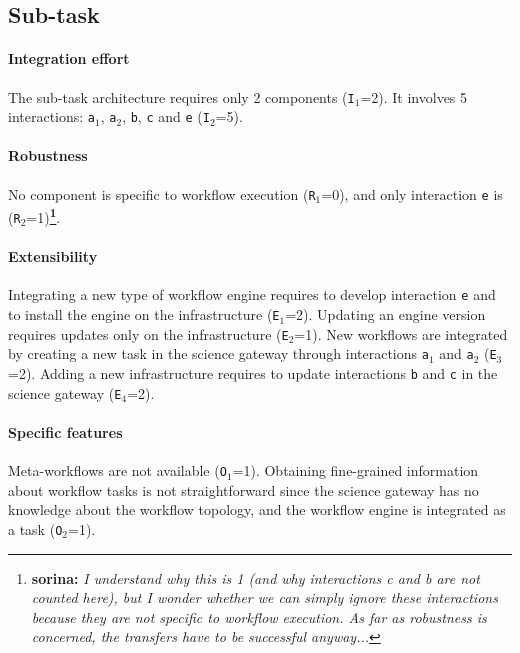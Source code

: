 \documentclass[preprint,3p,twocolumn]{elsarticle}
\newcommand{\todo}[1]{\color{blue}\xspace[\emph{#1}]\xspace\color{black}}
\newcommand{\note}[2]{\textbf{\Large{\color{blue}\footnote{{\color{blue}\textbf{#1:} \textit{#2}\color{black}}}}}}
\begin{document}
\subsection{Sub-task}

\paragraph{Integration effort} The sub-task architecture requires only 2
components (\texttt{I$_1$}=2).  It involves 5 interactions:
\texttt{a$_1$}, \texttt{a$_2$}, \texttt{b}, \texttt{c} and
\texttt{e} (\texttt{I$_2$}=5).

\paragraph{Robustness} No component is specific to workflow execution
(\texttt{R$_1$}=0), and only interaction \texttt{e} is
(\texttt{R$_2$}=1)\note{sorina}{I understand why this is 1 (and why interactions 
c and b are not counted here), but I wonder whether we can simply ignore these interactions
because they are not specific to workflow execution. As far as robustness is concerned,
the transfers have to be successful anyway...}.

\paragraph{Extensibility} Integrating a new type of workflow engine
requires to develop interaction \texttt{e} and to install the engine
on the infrastructure (\texttt{E$_1$}=2). Updating an engine version
requires updates only on the infrastructure (\texttt{E$_2$}=1).  New
workflows are integrated by creating a new task in the science gateway
through interactions \texttt{a$_1$} and \texttt{a$_2$}  (\texttt{E$_3$}=2). Adding a new
infrastructure requires to update interactions \texttt{b} and
\texttt{c} in the science gateway (\texttt{E$_4$}=2).

\paragraph{Specific features} Meta-workflows are not available
(\texttt{O$_1$}=1).  Obtaining fine-grained information about workflow
tasks is not straightforward since the science gateway has no
knowledge about the workflow topology, and the workflow engine is
integrated as a task (\texttt{O$_2$}=1).

\end{document}
